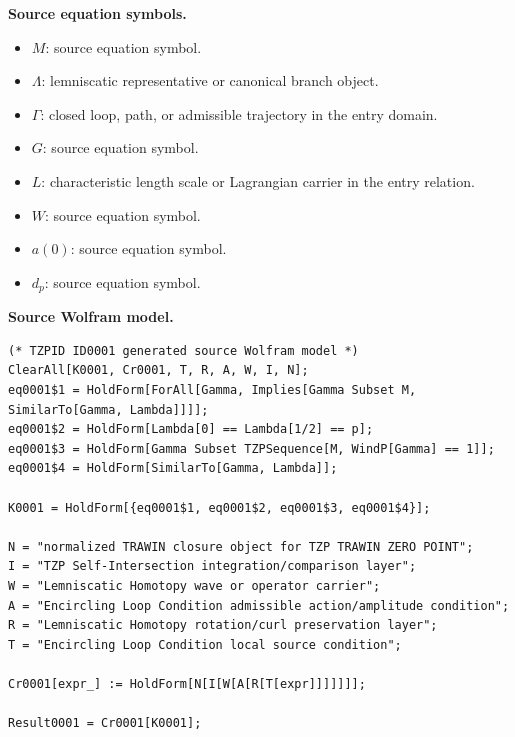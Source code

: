 \begin{minipage}[t]{0.49\linewidth}
\begingroup
\small
\raggedright
\textbf{Source equation symbols.}\par
\begin{itemize}[leftmargin=1.35em,itemsep=1pt,topsep=1pt,parsep=0pt]
    \item $M$: source equation symbol.
    \item $\Lambda$: lemniscatic representative or canonical branch object.
    \item $\Gamma$: closed loop, path, or admissible trajectory in the entry domain.
    \item $G$: source equation symbol.
    \item $L$: characteristic length scale or Lagrangian carrier in the entry relation.
    \item $W$: source equation symbol.
    \item $a(0)$: source equation symbol.
    \item $d_{p}$: source equation symbol.
\end{itemize}
\endgroup
\end{minipage}\hfill
\begin{minipage}[t]{0.47\linewidth}
\begingroup
\scriptsize
\raggedright
\textbf{Source Wolfram model.}\par
\begin{Verbatim}[fontsize=\tiny,breaklines=true,breakanywhere=true]
(* TZPID ID0001 generated source Wolfram model *)
ClearAll[K0001, Cr0001, T, R, A, W, I, N];
eq0001$1 = HoldForm[ForAll[Gamma, Implies[Gamma Subset M, SimilarTo[Gamma, Lambda]]]];
eq0001$2 = HoldForm[Lambda[0] == Lambda[1/2] == p];
eq0001$3 = HoldForm[Gamma Subset TZPSequence[M, WindP[Gamma] == 1]];
eq0001$4 = HoldForm[SimilarTo[Gamma, Lambda]];

K0001 = HoldForm[{eq0001$1, eq0001$2, eq0001$3, eq0001$4}];

N = "normalized TRAWIN closure object for TZP TRAWIN ZERO POINT";
I = "TZP Self-Intersection integration/comparison layer";
W = "Lemniscatic Homotopy wave or operator carrier";
A = "Encircling Loop Condition admissible action/amplitude condition";
R = "Lemniscatic Homotopy rotation/curl preservation layer";
T = "Encircling Loop Condition local source condition";

Cr0001[expr_] := HoldForm[N[I[W[A[R[T[expr]]]]]]];

Result0001 = Cr0001[K0001];
\end{Verbatim}
\endgroup
\end{minipage}

